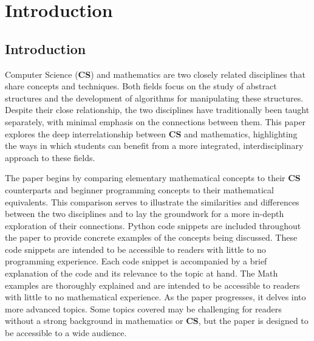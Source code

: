     
\chapter{Introduction}

\section{Introduction}

Computer Science (\textbf{CS}) and mathematics are two closely related disciplines that share concepts and techniques. Both fields focus on the study of abstract structures and the development of algorithms for manipulating these structures. Despite their close relationship, the two disciplines have traditionally been taught separately, with minimal emphasis on the connections between them. This paper explores the deep interrelationship between \textbf{CS} and mathematics, highlighting the ways in which students can benefit from a more integrated, interdisciplinary approach to these fields.

The paper begins by comparing elementary mathematical concepts to their \textbf{CS} counterparts and beginner programming concepts to their mathematical equivalents. This comparison serves to illustrate the similarities and differences between the two disciplines and to lay the groundwork for a more in-depth exploration of their connections. Python code snippets are included throughout the paper to provide concrete examples of the concepts being discussed. These code snippets are intended to be accessible to readers with little to no programming experience. Each code snippet is accompanied by a brief explanation of the code and its relevance to the topic at hand. The Math examples are thoroughly explained and are intended to be accessible to readers with little to no mathematical experience. As the paper progresses, it delves into more advanced topics. Some topics covered may be challenging for readers without a strong background in mathematics or \textbf{CS}, but the paper is designed to be accessible to a wide audience.
    
